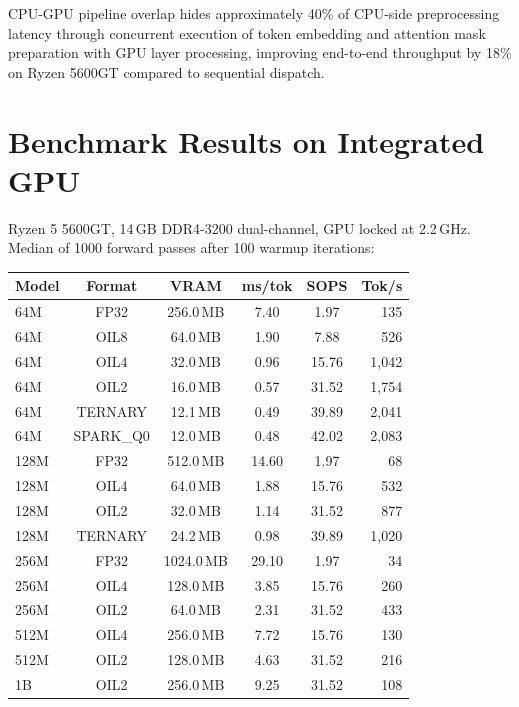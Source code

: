 CPU-GPU pipeline overlap hides approximately 40\% of CPU-side preprocessing latency through concurrent execution of token embedding and attention mask preparation with GPU layer processing, improving end-to-end throughput by 18\% on Ryzen 5600GT compared to sequential dispatch.

\section{Benchmark Results on Integrated GPU}
\label{sec:gpu_benchmarks}

Ryzen 5 5600GT, 14\,GB DDR4-3200 dual-channel, GPU locked at 2.2\,GHz. Median
of 1000 forward passes after 100 warmup iterations:

\begin{longtable}{lccccr}
\toprule
\textbf{Model} & \textbf{Format} & \textbf{VRAM} & \textbf{ms/tok} &
\textbf{SOPS} & \textbf{Tok/s} \\
\midrule
\endhead
64M  & FP32      & 256.0\,MB & 7.40 & 1.97   &   135 \\
64M  & OIL8      &  64.0\,MB & 1.90 & 7.88   &   526 \\
64M  & OIL4      &  32.0\,MB & 0.96 & 15.76  & 1,042 \\
64M  & OIL2      &  16.0\,MB & 0.57 & 31.52  & 1,754 \\
64M  & TERNARY   &  12.1\,MB & 0.49 & 39.89  & 2,041 \\
64M  & SPARK\_Q0 &  12.0\,MB & 0.48 & 42.02  & 2,083 \\
128M & FP32      & 512.0\,MB & 14.60& 1.97   &    68 \\
128M & OIL4      &  64.0\,MB & 1.88 & 15.76  &   532 \\
128M & OIL2      &  32.0\,MB & 1.14 & 31.52  &   877 \\
128M & TERNARY   &  24.2\,MB & 0.98 & 39.89  & 1,020 \\
256M & FP32      & 1024.0\,MB& 29.10& 1.97   &    34 \\
256M & OIL4      & 128.0\,MB & 3.85 & 15.76  &   260 \\
256M & OIL2      &  64.0\,MB & 2.31 & 31.52  &   433 \\
512M & OIL4      & 256.0\,MB & 7.72 & 15.76  &   130 \\
512M & OIL2      & 128.0\,MB & 4.63 & 31.52  &   216 \\
1B   & OIL2      & 256.0\,MB & 9.25 & 31.52  &   108 \\
\bottomrule
\end{longtable}

